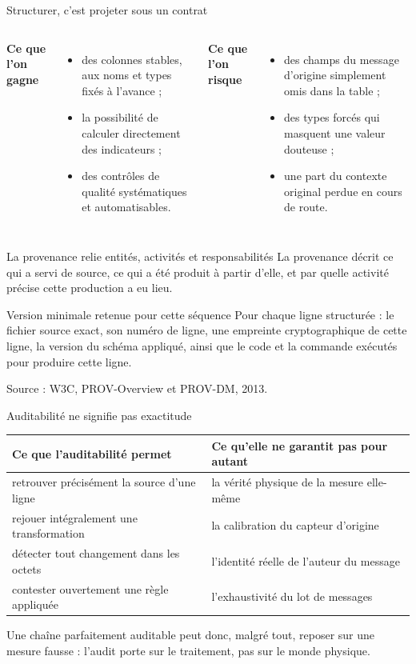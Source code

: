 \documentclass[aspectratio=169]{beamer}
\newcommand{\sourcefoot}[1]{\vfill\tiny\color{gray}Source : #1}
\begin{document}
\begin{frame}{Structurer, c'est projeter sous un contrat}
\begin{columns}
\textbf{Ce que l'on gagne}
\begin{itemize}
\item des colonnes stables, aux noms et types fixés à l'avance ;
\item la possibilité de calculer directement des indicateurs ;
\item des contrôles de qualité systématiques et automatisables.
\end{itemize}
\textbf{Ce que l'on risque}
\begin{itemize}
\item des champs du message d'origine simplement omis dans la table ;
\item des types forcés qui masquent une valeur douteuse ;
\item une part du contexte original perdue en cours de route.
\end{itemize}
\end{columns}
\end{frame}

\begin{frame}{La provenance relie entités, activités et responsabilités}
La provenance décrit ce qui a servi de source, ce qui a été produit à partir d'elle, et par quelle activité précise cette production a eu lieu.
\begin{exampleblock}{Version minimale retenue pour cette séquence}
Pour chaque ligne structurée : le fichier source exact, son numéro de ligne, une empreinte cryptographique de cette ligne, la version du schéma appliqué, ainsi que le code et la commande exécutés pour produire cette ligne.
\end{exampleblock}
\sourcefoot{W3C, PROV-Overview et PROV-DM, 2013.}
\end{frame}

\begin{frame}{Auditabilité ne signifie pas exactitude}
\begin{tabular}{@{}p{}p{}@{}}
\toprule
Ce que l'auditabilité permet & Ce qu'elle ne garantit pas pour autant \\
\midrule
retrouver précisément la source d'une ligne & la vérité physique de la mesure elle-même \\[2pt]
rejouer intégralement une transformation & la calibration du capteur d'origine \\[2pt]
détecter tout changement dans les octets & l'identité réelle de l'auteur du message \\[2pt]
contester ouvertement une règle appliquée & l'exhaustivité du lot de messages \\
\bottomrule
\end{tabular}
\vfill
\normalsize Une chaîne parfaitement auditable peut donc, malgré tout, reposer sur une mesure fausse : l'audit porte sur le traitement, pas sur le monde physique.
\end{frame}
\end{document}
